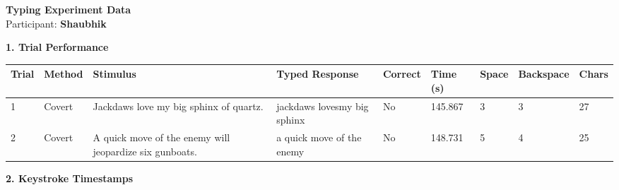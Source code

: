 \documentclass[10pt,a4paper]{article}
\begin{document}

\begin{center}
    {\Large\bfseries Typing Experiment Data}\\
    \vspace{2pt}
    Participant: \textbf{Shaubhik}
\end{center}

\vspace{0.25cm}


\noindent
{\large\bfseries 1. Trial Performance}

\vspace{0.08cm}

\begin{center}
\begin{tabularx}{\textwidth}{
    C{0.45in}
    C{0.65in}
    L{2.35in}
    L{2.55in}
    C{0.65in}
    C{0.65in}
    C{0.55in}
    C{0.75in}
    C{0.55in}
}
\toprule

\textbf{Trial} &
\textbf{Method} &
\textbf{Stimulus} &
\textbf{Typed Response} &
\textbf{Correct} &
\textbf{Time (s)} &
\textbf{Space} &
\textbf{Backspace} &
\textbf{Chars}
\\

\midrule

1 &
Covert &
Jackdaws love my big sphinx of quartz. &
jackdaws lovesmy big sphinx &
No &
145.867 &
3 &
3 &
27
\\

2 &
Covert &
A quick move of the enemy will jeopardize six gunboats. &
a quick move of the enemy &
No &
148.731 &
5 &
4 &
25
\\

\bottomrule
\end{tabularx}
\end{center}

\vspace{0.35cm}


\noindent
{\large\bfseries 2. Keystroke Timestamps}

\vspace{0.08cm}
\end{document}

